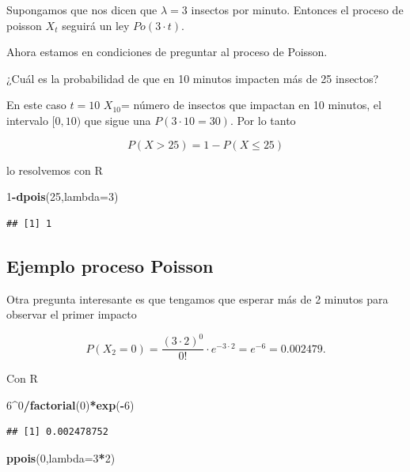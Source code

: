 \documentclass[]{book}
\newenvironment{Shaded}{\begin{snugshade}}{\end{snugshade}}
\newcommand{\DataTypeTok}[1]{\textcolor[rgb]{0.13,0.29,0.53}{#1}}
\newcommand{\DecValTok}[1]{\textcolor[rgb]{0.00,0.00,0.81}{#1}}
\newcommand{\KeywordTok}[1]{\textcolor[rgb]{0.13,0.29,0.53}{\textbf{#1}}}
\newcommand{\NormalTok}[1]{#1}
\newcommand{\OperatorTok}[1]{\textcolor[rgb]{0.81,0.36,0.00}{\textbf{#1}}}
\begin{document}
Supongamos que nos dicen que \(\lambda=3\) insectos por minuto. Entonces el proceso de poisson \(X_t\) seguirá un ley \(Po(3\cdot t).\)

Ahora estamos en condiciones de preguntar al proceso de Poisson.

¿Cuál es la probabilidad de que en 10 minutos impacten más de 25 insectos?

En este caso \(t=10\) \(X_{10}\)= número de insectos que impactan en 10 minutos, el intervalo \([0,10)\) que sigue una \(P(3\cdot 10=30)\). Por lo tanto

\[P(X>25)=1-P(X\leq 25)\]

lo resolvemos con R

\begin{Shaded}
\begin{Highlighting}[]
\DecValTok{1}\OperatorTok{-}\KeywordTok{dpois}\NormalTok{(}\DecValTok{25}\NormalTok{,}\DataTypeTok{lambda=}\DecValTok{3}\NormalTok{)}
\end{Highlighting}
\end{Shaded}

\begin{verbatim}
## [1] 1
\end{verbatim}

\hypertarget{ejemplo-proceso-poisson-2}{%
\subsection{Ejemplo proceso Poisson}\label{ejemplo-proceso-poisson-2}}

Otra pregunta interesante es que tengamos que esperar más de 2 minutos para observar el primer impacto

\[P(X_2=0)=\frac{(3\cdot 2)^0}{0!}\cdot e^{-3\cdot 2}= e^{-6}=0.002479.\]

Con R

\begin{Shaded}
\begin{Highlighting}[]
\DecValTok{6}\OperatorTok{^}\DecValTok{0}\OperatorTok{/}\KeywordTok{factorial}\NormalTok{(}\DecValTok{0}\NormalTok{)}\OperatorTok{*}\KeywordTok{exp}\NormalTok{(}\OperatorTok{-}\DecValTok{6}\NormalTok{)}
\end{Highlighting}
\end{Shaded}

\begin{verbatim}
## [1] 0.002478752
\end{verbatim}

\begin{Shaded}
\begin{Highlighting}[]
\KeywordTok{ppois}\NormalTok{(}\DecValTok{0}\NormalTok{,}\DataTypeTok{lambda=}\DecValTok{3}\OperatorTok{*}\DecValTok{2}\NormalTok{)}
\end{Highlighting}
\end{Shaded}
\end{document}
